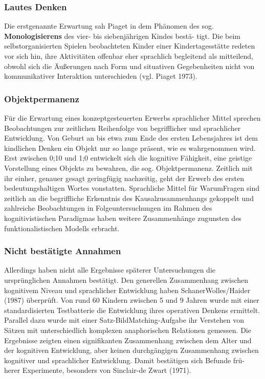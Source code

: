\documentclass[
  letterpaper,
]{scrbook}
\begin{document}
\hypertarget{lautes-denken}{%
\subsubsection{\texorpdfstring{\textbf{Lautes
Denken}}{Lautes Denken}}\label{lautes-denken}}

Die erstgenannte Erwartung sah Piaget in dem Phänomen des sog.
\textbf{Monologisierens} des vier- bis siebenjährigen Kindes bestä-
tigt. Die beim selbstorganisierten Spielen beobachteten Kinder einer
Kindertagesstätte redeten vor sich hin, ihre Aktivitäten offenbar eher
sprachlich begleitend als mitteilend, obwohl sich die Äußerungen nach
Form und situativen Gegebenheiten nicht von kommunikativer Interaktion
unterschieden (vgl. Piaget 1973).

\hypertarget{objektpermanenz}{%
\subsubsection{\texorpdfstring{\textbf{Objektpermanenz}}{Objektpermanenz}}\label{objektpermanenz}}

Für die Erwartung eines konzeptgesteuerten Erwerbs sprachlicher Mittel
sprechen Beobachtungen zur zeitlichen Reihenfolge von begrifflicher und
sprachlicher Entwicklung. Von Geburt an bis etwa zum Ende des ersten
Lebensjahres ist dem kindlichen Denken ein Objekt nur so lange präsent,
wie es wahrgenommen wird. Erst zwischen 0;10 und 1;0 entwickelt sich die
kognitive Fähigkeit, eine geistige Vorstellung eines Objekts zu
bewahren, die sog. Objektpermanenz. Zeitlich mit ihr einher, genauer
gesagt geringfügig nachzeitig, geht der Erwerb des ersten
bedeutungshaltigen Wortes vonstatten. Sprachliche Mittel für WarumFragen
sind zeitlich an die begriffliche Erkenntnis des Kausalzusammenhangs
gekoppelt und zahlreiche Beobachtungen in Folgeuntersuchungen im Rahmen
des kognitivistischen Paradigmas haben weitere Zusammenhänge zugunsten
des funktionalistischen Modells erbracht.

\hypertarget{nicht-bestuxe4tigte-annahmen}{%
\subsubsection{Nicht bestätigte
Annahmen}\label{nicht-bestuxe4tigte-annahmen}}

Allerdings haben nicht alle Ergebnisse späterer Untersuchungen die
ursprünglichen Annahmen bestätigt. Den generellen Zusammenhang zwischen
kognitivem Niveau und sprachlicher Entwicklung haben
SchanerWolles/Haider (1987) überprüft. Von rund 60 Kindern zwischen 5
und 9 Jahren wurde mit einer standardisierten Testbatterie die
Entwicklung ihres operativen Denkens ermittelt. Parallel dazu wurde mit
einer Satz-BildMatching-Aufgabe ihr Verstehen von Sätzen mit
unterschiedlich komplexen anaphorischen Relationen gemessen. Die
Ergebnisse zeigten einen signifikanten Zusammenhang zwischen dem Alter
und der kognitiven Entwicklung, aber keinen durchgängigen Zusammenhang
zwischen kognitiver und sprachlicher Entwicklung. Damit bestätigen sich
Befunde frü- herer Experimente, besonders von Sinclair-de Zwart (1971).
\end{document}
